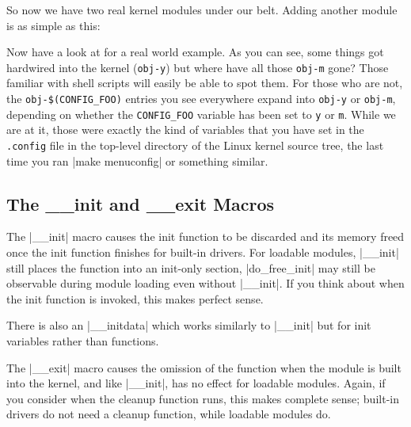 \documentclass[10pt, oneside]{book}
\begin{document}

So now we have two real kernel modules under our belt. Adding another module is as simple as this:


Now have a look at  for a real world example.
As you can see, some things got hardwired into the kernel (\verb|obj-y|) but where have all those \verb|obj-m| gone?
Those familiar with shell scripts will easily be able to spot them.
For those who are not, the \verb|obj-$(CONFIG_FOO)| entries you see everywhere expand into \verb|obj-y| or \verb|obj-m|,
depending on whether the \verb|CONFIG_FOO| variable has been set to \verb|y| or \verb|m|.
While we are at it, those were exactly the kind of variables that you have set in the \verb|.config| file in the top-level directory of the Linux kernel source tree,
the last time you ran \sh|make menuconfig| or something similar.

\subsection{The \_\_init and \_\_exit Macros}
\label{sec:init_n_exit}
The \cpp|__init| macro causes the init function to be discarded and its memory freed once the init function finishes for built-in drivers.
For loadable modules, \cpp|__init| still places the function into an init-only section, \cpp|do_free_init| may still be observable during module loading even without \cpp|__init|.
If you think about when the init function is invoked, this makes perfect sense.

There is also an \cpp|__initdata| which works similarly to \cpp|__init| but for init variables rather than functions.

The \cpp|__exit| macro causes the omission of the function when the module is built into the kernel, and like \cpp|__init|, has no effect for loadable modules.
Again, if you consider when the cleanup function runs, this makes complete sense; built-in drivers do not need a cleanup function, while loadable modules do.
\end{document}
